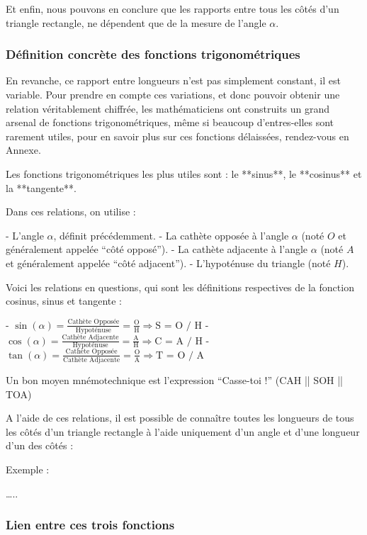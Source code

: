 \documentclass[a4paper]{article}
\begin{document}
			\medbreak

			Et enfin, 
			nous pouvons en conclure que les rapports entre tous les côtés d'un triangle rectangle,
			ne dépendent que de la mesure de l'angle $\alpha$.

		\subsubsection{Définition concrète des fonctions trigonométriques}

			En revanche, ce rapport entre longueurs n'est pas simplement constant, il est variable. Pour prendre en compte ces variations, et donc pouvoir obtenir une relation véritablement chiffrée, les mathématiciens ont construits un grand arsenal de fonctions trigonométriques, même si beaucoup d'entres-elles sont rarement utiles, pour en savoir plus sur ces fonctions délaissées, rendez-vous en Annexe.

			Les fonctions trigonométriques les plus utiles sont : le **sinus**, le **cosinus** et la **tangente**.

			Dans ces relations, on utilise : 

			- L'angle $\alpha$, définit précédemment.
			- La cathète opposée à l'angle $\alpha$ (noté $O$ et généralement appelée “côté opposé”).
			- La cathète adjacente à l'angle $\alpha$ (noté $A$ et généralement appelée “côté adjacent”).
			- L'hypoténuse du triangle (noté $H$).

			Voici les relations en questions, qui sont les définitions respectives de la fonction cosinus, sinus et tangente :

			- $\sin(\alpha) = \frac{\text{Cathète Opposée}}{\text{Hypoténuse}} = \frac{\text{O}}{\text{H}} \Longrightarrow \text{S = O / H} $
			- $\cos(\alpha) = \frac{\text{Cathète Adjacente}}{\text{Hypoténuse}} = \frac{\text{A}}{\text{H}} \Longrightarrow \text{C = A / H} $
			- $\tan(\alpha) = \frac{\text{Cathète Opposée}}{\text{Cathète Adjacente}} = \frac{\text{O}}{\text{A}} \Longrightarrow \text{T = O / A} $

			Un bon moyen mnémotechnique est l'expression “Casse-toi !” (CAH || SOH || TOA)

			A l'aide de ces relations, il est possible de connaître toutes les longueurs de tous les côtés d'un triangle rectangle à l'aide uniquement d'un angle et d'une longueur d'un des côtés : 

			Exemple :

			…..

		\subsubsection{Lien entre ces trois fonctions}
\end{document}
